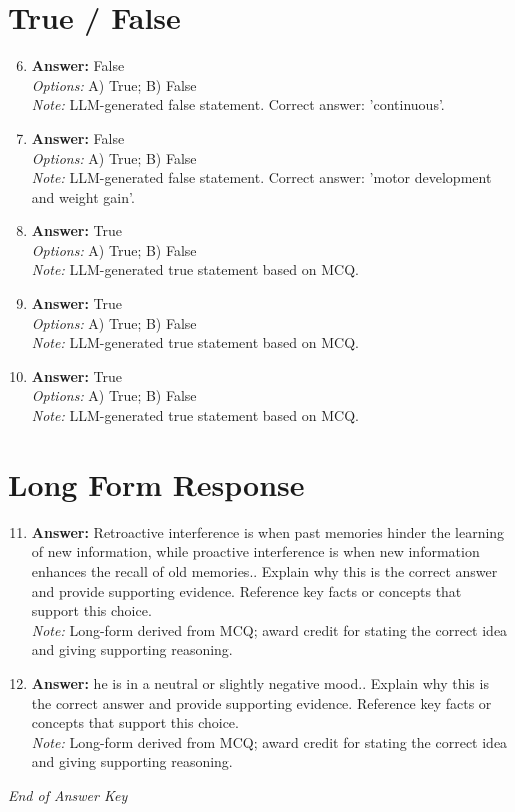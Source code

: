 \documentclass[12pt]{article}
\begin{document}
\section*{True / False}
\begin{enumerate}[label=\arabic*.]
\setcounter{enumi}{5}
\item \textbf{Answer:} False
\\ \textit{Options:} A) True; B) False
\\ \textit{Note:} LLM-generated false statement. Correct answer: 'continuous'.
\item \textbf{Answer:} False
\\ \textit{Options:} A) True; B) False
\\ \textit{Note:} LLM-generated false statement. Correct answer: 'motor development and weight gain'.
\item \textbf{Answer:} True
\\ \textit{Options:} A) True; B) False
\\ \textit{Note:} LLM-generated true statement based on MCQ.
\item \textbf{Answer:} True
\\ \textit{Options:} A) True; B) False
\\ \textit{Note:} LLM-generated true statement based on MCQ.
\item \textbf{Answer:} True
\\ \textit{Options:} A) True; B) False
\\ \textit{Note:} LLM-generated true statement based on MCQ.
\end{enumerate}

\section*{Long Form Response}
\begin{enumerate}[label=\arabic*.]
\setcounter{enumi}{10}
\item \textbf{Answer:} Retroactive interference is when past memories hinder the learning of new information, while proactive interference is when new information enhances the recall of old memories.. Explain why this is the correct answer and provide supporting evidence. Reference key facts or concepts that support this choice.
\\ \textit{Note:} Long-form derived from MCQ; award credit for stating the correct idea and giving supporting reasoning.
\item \textbf{Answer:} he is in a neutral or slightly negative mood.. Explain why this is the correct answer and provide supporting evidence. Reference key facts or concepts that support this choice.
\\ \textit{Note:} Long-form derived from MCQ; award credit for stating the correct idea and giving supporting reasoning.
\end{enumerate}

\vfill
\noindent\textit{End of Answer Key}
\end{document}

